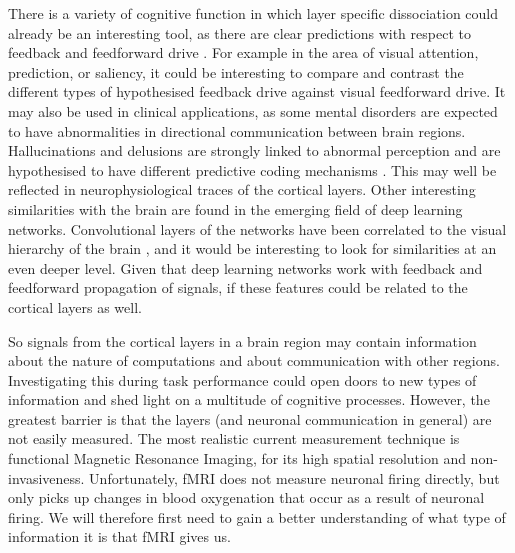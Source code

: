 There is a variety of cognitive function in which layer specific dissociation could already be an interesting tool, as there are clear predictions with respect to feedback and feedforward drive \cite{Lawrence2017}. For example in the area of visual attention, prediction, or saliency, it could be interesting to compare and contrast the different types of hypothesised feedback drive against visual feedforward drive. It may also be used in clinical applications, as some mental disorders are expected to have abnormalities in directional communication between brain regions. Hallucinations and delusions are strongly linked to abnormal perception and are hypothesised to have different predictive coding mechanisms \cite{Fletcher2008}. This may well be reflected in neurophysiological traces of the cortical layers. Other interesting similarities with the brain are found in the emerging field of deep learning networks. Convolutional layers of the networks have been correlated to the visual hierarchy of the brain \cite{Guclu2015}, and it would be interesting to look for similarities at an even deeper level. Given that deep learning networks work with feedback and feedforward propagation of signals, if these features could be related to the cortical layers as well.

So signals from the cortical layers in a brain region may contain information about the nature of computations and about communication with other regions. Investigating this during task performance could open doors to new types of information and shed light on a multitude of cognitive processes. However, the greatest barrier is that the layers (and neuronal communication in general) are not easily measured. The most realistic current measurement technique is functional Magnetic Resonance Imaging, for its high spatial resolution and non-invasiveness. Unfortunately, fMRI does not measure neuronal firing directly, but only picks up changes in blood oxygenation that occur as a result of neuronal firing. We will therefore first need to gain a better understanding of what type of information it is that fMRI gives us.

